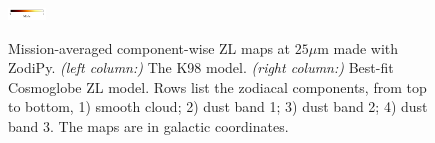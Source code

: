 \documentclass[twocolumn]{aa}
\begin{document}
\begin{figure}[hbt]
{    \includegraphics[width=1cm,angle=90]{figs/comp_maps/cbar_3.pdf}%
    }\\
    \caption{Mission-averaged component-wise ZL maps at $25\mu$m made with ZodiPy. 
    \textit{(left column:)} The K98 model. \textit{(right column:)} Best-fit Cosmoglobe ZL model.
    Rows list the zodiacal components, from top to bottom, 1) smooth cloud; 2) dust band 1; 3) 
    dust band 2; 4) dust band 3. The maps are in galactic coordinates.}
    \label{fig:mission-averaged-comp-maps}
\end{figure}

\begin{figure}
    \centering
    \\
    \\
\end{figure}
\end{document}
